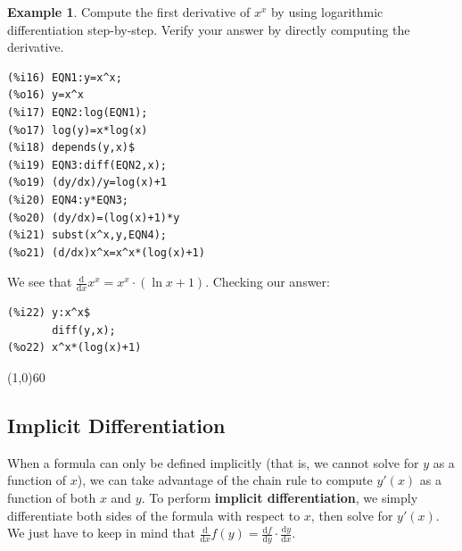 \documentclass[10.5pt,twoside]{report}
\theoremstyle{definition}
\newtheorem{exmp}{Example}[section]
\begin{document}
\begin{exmp}  Compute the first derivative of $x^x$ by using logarithmic differentiation step-by-step.  Verify your answer by directly computing the derivative.\\

\begin{verbatim}
(%i16) EQN1:y=x^x;
(%o16) y=x^x
(%i17) EQN2:log(EQN1);
(%o17) log(y)=x*log(x)
(%i18) depends(y,x)$
(%i19) EQN3:diff(EQN2,x);
(%o19) (dy/dx)/y=log(x)+1
(%i20) EQN4:y*EQN3;
(%o20) (dy/dx)=(log(x)+1)*y
(%i21) subst(x^x,y,EQN4);
(%o21) (d/dx)x^x=x^x*(log(x)+1)
\end{verbatim}

We see that $\frac{\mathrm{d}}{\mathrm{d}x} x^x = x^x\cdot (\ln{x}+1)$.  Checking our answer:


\begin{verbatim}
(%i22) y:x^x$
       diff(y,x);
(%o22) x^x*(log(x)+1)
\end{verbatim}

\end{exmp}

\line(1,0){60}
\linethickness{0.5mm}

\subsection{Implicit Differentiation}

When a formula can only be defined implicitly (that is, we cannot solve for $y$ as a function of $x$), we can take advantage of the chain rule to compute $y'(x)$ as a function of both $x$ and $y$.  To perform \textbf{implicit differentiation}, we simply differentiate both sides of the formula with respect to $x$, then solve for $y'(x)$.  We just have to keep in mind that $\frac{\mathrm{d}}{\mathrm{d}x}f(y)=\frac{\mathrm{d}f}{\mathrm{d}y}\cdot\frac{\mathrm{d}y}{\mathrm{d}x}$.
\end{document}
